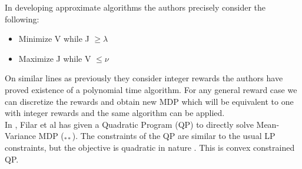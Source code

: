 \documentclass[11pt,a4paper,oneside]{report}
\begin{document}
In developing approximate algorithms the authors precisely consider the following:
\begin{itemize}
\item Minimize V while J $\geq \lambda$
\item Maximize J while V $\leq \nu$
\end{itemize}
On similar lines as previously they consider integer rewards the authors have proved existence of a polynomial time algorithm. For any general reward case we can discretize the rewards and obtain new MDP which will be equivalent to one with integer rewards and the same algorithm can be applied.\\

In \citep{filar1989variance}, Filar et al has given a Quadratic Program (QP) to directly solve Mean-Variance MDP ($_{**}$). The constraints of the QP are similar to the usual LP constraints, but the objective is quadratic in nature \cite[equations(2.9)]{filar1989variance}. This is convex constrained QP.
\end{document}
